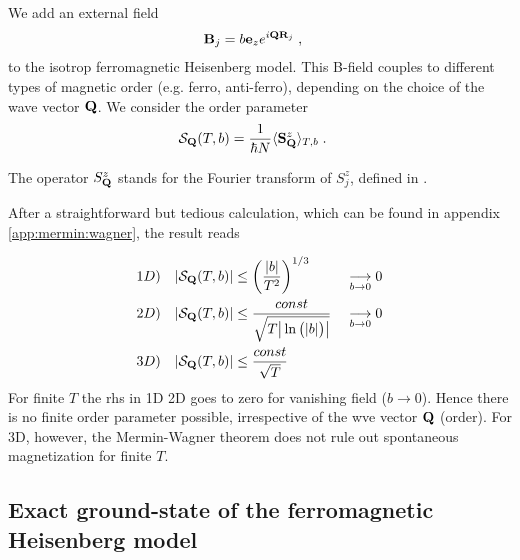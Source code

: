 We add an external field 
\begin{align*}
\mathbf B_{j} &= b \mathbf e_{z} e^{i \mathbf Q \mathbf R_{j}}\;,
\end{align*}
%
to the isotrop ferromagnetic Heisenberg model.
This B-field  couples to different types of magnetic order (e.g. ferro, anti-ferro), depending on the choice of the wave vector $\mathbf Q$. 
%
We consider the order parameter 
%
\begin{align}
{\cal S}_{\mathbf Q}(T,b) &= \frac{1}{\hbar N}\langle \mathbf S^{z}_{\mathbf Q}\rangle_{T,b}\;.
\end{align}

The operator $S^{z}_{\mathbf Q}$ stands for the Fourier transform of $S_{j}^{z}$, defined in .

After a straightforward but tedious calculation, which can be found in appendix \ref{app:mermin:wagner}, the result reads
%

\begin{subequations}\label{eq:}
\begin{align}
1D) &&\abs{{\cal S}_{\mathbf Q}(T,b)}&\le \bigg(\frac{  \abs{b}}{T^{2}}\bigg)^{1/3} &&\underset{b\to 0}{\longrightarrow} 0\\
2D) &&\abs{{\cal S}_{\mathbf Q}(T,b)}&\le 
\frac{const}{\sqrt{T
  \big|  \ln\big( \abs{b}  \big)\big| }}&&\underset{b\to 0}{\longrightarrow} 0\\
3D) &&  \abs{{\cal S}_{\mathbf Q}(T,b)} &\le \frac{const}{\sqrt{T}}
\end{align}
\end{subequations}
%
For finite $T$ the rhs in 1D 2D goes to zero for vanishing field ($b\to 0$).
Hence there is no finite order parameter possible, irrespective of the wve vector $\mathbf Q$ (order). 
For 3D, however, the Mermin-Wagner theorem does not rule out spontaneous  magnetization for finite $T$.



 
 \subsection{Exact ground-state of the ferromagnetic Heisenberg model}

